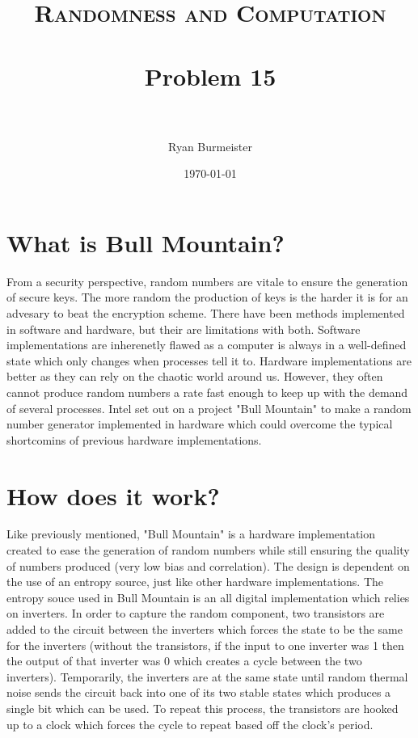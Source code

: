 \documentclass[fontsize=12pt]{article}
\title{ 
  \normalfont \normalsize 
  \textsc{Randomness and Computation} \\ [25pt] %
  \horrule{0.5pt} \\[0.4cm] %
  \huge Problem 15 \\ %
  \horrule{2pt} \\[0.5cm] %
}
\author{Ryan Burmeister} %
\date{\normalsize\today} %
\numberwithin{equation}{section} %
\numberwithin{figure}{section} %
\numberwithin{table}{section} %
\begin{document}
\maketitle %

\section{What is Bull Mountain?}
From a security perspective, random numbers are vitale to ensure the generation
of secure keys.  The more random the production of keys is the harder it is for
an advesary to beat the encryption scheme.  There have been methods implemented
in software and hardware, but their are limitations with both.  Software
implementations are inherenetly flawed as a computer is always in a
well-defined state which only changes when processes tell it to.  Hardware
implementations are better as they can rely on the chaotic world around us.
However, they often cannot produce random numbers a rate fast enough to keep up
with the demand of several processes.  Intel set out on a project "Bull
Mountain" to make a random number generator implemented in hardware which could
overcome the typical shortcomins of previous hardware implementations. 
\section{How does it work?}
Like previously mentioned, "Bull Mountain" is a hardware implementation created
to ease the generation of random numbers while still ensuring the quality of
numbers produced (very low bias and correlation). The design is dependent on
the use of an entropy source, just like other hardware implementations.  The
entropy souce used in Bull Mountain is an all digital implementation which
relies on inverters.  In order to capture the random component, two transistors
are added to the circuit between the inverters which forces the state to be the
same for the inverters (without the transistors, if the input to one inverter
was 1 then the output of that inverter was 0 which creates a cycle between the
two inverters).  Temporarily, the inverters are at the same state until random
thermal noise sends the circuit back into one of its two stable states which
produces a single bit which can be used.  To repeat this process, the
transistors are hooked up to a clock which forces the cycle to repeat based off
the clock's period.
\end{document}
